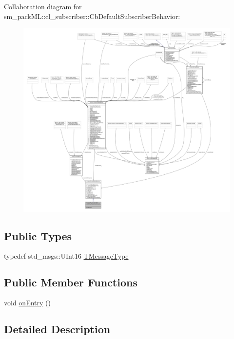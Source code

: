 Collaboration diagram for sm\+\_\+pack\+ML\+:\+:cl\+\_\+subscriber\+:\+:Cb\+Default\+Subscriber\+Behavior\+:
\nopagebreak
\begin{figure}[H]
\begin{center}
\leavevmode
\includegraphics[width=350pt]{classsm__packML_1_1cl__subscriber_1_1CbDefaultSubscriberBehavior__coll__graph}
\end{center}
\end{figure}
\subsection*{Public Types}
\begin{DoxyCompactItemize}
\item 
typedef std\+\_\+msgs\+::\+U\+Int16 \hyperlink{classsm__packML_1_1cl__subscriber_1_1CbDefaultSubscriberBehavior_aa4a14643d9c7effc94d4fb89f9d276e1}{T\+Message\+Type}
\end{DoxyCompactItemize}
\subsection*{Public Member Functions}
\begin{DoxyCompactItemize}
\item 
void \hyperlink{classsm__packML_1_1cl__subscriber_1_1CbDefaultSubscriberBehavior_aef08a915fdc4e4c17e907822ac2a22e6}{on\+Entry} ()
\end{DoxyCompactItemize}


\subsection{Detailed Description}


